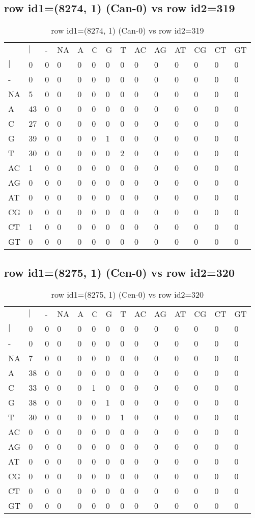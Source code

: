 \subsection{row id1=(8274, 1) (Can-0) vs row id2=319}
\begin{center}
\begin{longtable}{|l|l|l|l|l|l|l|l|l|l|l|l|l|l|}
\caption{row id1=(8274, 1) (Can-0) vs row id2=319} \label{table_dm426}\\
\hline
\\
\hline
&$|$&-&NA&A&C&G&T&AC&AG&AT&CG&CT&GT\\
$|$&0&0&0&0&0&0&0&0&0&0&0&0&0\\
-&0&0&0&0&0&0&0&0&0&0&0&0&0\\
NA&5&0&0&0&0&0&0&0&0&0&0&0&0\\
A&43&0&0&0&0&0&0&0&0&0&0&0&0\\
C&27&0&0&0&0&0&0&0&0&0&0&0&0\\
G&39&0&0&0&0&1&0&0&0&0&0&0&0\\
T&30&0&0&0&0&0&2&0&0&0&0&0&0\\
AC&1&0&0&0&0&0&0&0&0&0&0&0&0\\
AG&0&0&0&0&0&0&0&0&0&0&0&0&0\\
AT&0&0&0&0&0&0&0&0&0&0&0&0&0\\
CG&0&0&0&0&0&0&0&0&0&0&0&0&0\\
CT&1&0&0&0&0&0&0&0&0&0&0&0&0\\
GT&0&0&0&0&0&0&0&0&0&0&0&0&0\\
\hline
\end{longtable}
\end{center}

\subsection{row id1=(8275, 1) (Cen-0) vs row id2=320}
\begin{center}
\begin{longtable}{|l|l|l|l|l|l|l|l|l|l|l|l|l|l|}
\caption{row id1=(8275, 1) (Cen-0) vs row id2=320} \label{table_dm428}\\
\hline
\\
\hline
&$|$&-&NA&A&C&G&T&AC&AG&AT&CG&CT&GT\\
$|$&0&0&0&0&0&0&0&0&0&0&0&0&0\\
-&0&0&0&0&0&0&0&0&0&0&0&0&0\\
NA&7&0&0&0&0&0&0&0&0&0&0&0&0\\
A&38&0&0&0&0&0&0&0&0&0&0&0&0\\
C&33&0&0&0&1&0&0&0&0&0&0&0&0\\
G&38&0&0&0&0&1&0&0&0&0&0&0&0\\
T&30&0&0&0&0&0&1&0&0&0&0&0&0\\
AC&0&0&0&0&0&0&0&0&0&0&0&0&0\\
AG&0&0&0&0&0&0&0&0&0&0&0&0&0\\
AT&0&0&0&0&0&0&0&0&0&0&0&0&0\\
CG&0&0&0&0&0&0&0&0&0&0&0&0&0\\
CT&0&0&0&0&0&0&0&0&0&0&0&0&0\\
GT&0&0&0&0&0&0&0&0&0&0&0&0&0\\
\hline
\end{longtable}
\end{center}

